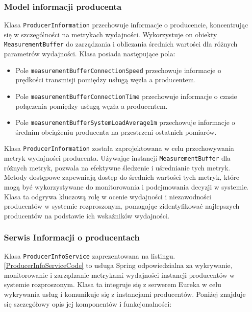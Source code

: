 \subsubsection{Model informacji producenta}

Klasa \verb|ProducerInformation| przechowuje informacje o producencie, koncentrując się w szczególności na metrykach wydajności. Wykorzystuje on obiekty \verb|MeasurementBuffer| do zarządzania i obliczania średnich wartości dla różnych parametrów wydajności. Klasa posiada następujące pola:

\begin{itemize}
    \item Pole \verb|measurementBufferConnectionSpeed| przechowuje informacje o prędkości transmisji pomiędzy usługą węzła a producentem.
    \item Pole \verb|measurementBufferConnectionTime| przechowuje informacje o czasie połączenia pomiędzy usługą węzła a producentem.
    \item Pole \verb|measurementBufferSystemLoadAverage1m| przechowuje informacje o średnim obciążeniu producenta na przestrzeni ostatnich pomiarów.
\end{itemize}

Klasa \verb|ProducerInformation| została zaprojektowana w celu przechowywania metryk wydajności producenta. Używając instancji \verb|MeasurementBuffer| dla różnych metryk, pozwala na efektywne śledzenie i uśrednianie tych metryk. Metody dostępowe zapewniają dostęp do średnich wartości tych metryk, które mogą być wykorzystywane do monitorowania i podejmowania decyzji w systemie. Klasa ta odgrywa kluczową rolę w ocenie wydajności i niezawodności producentów w systemie rozproszonym, pomagając zidentyfikować najlepszych producentów na podstawie ich wskaźników wydajności.

\subsubsection{Serwis Informacji o producentach}

Klasa \verb|ProducerInfoService| zaprezentowana na listingu.\ref{ProducerInfoServiceCode} to usługa Spring odpowiedzialna za wykrywanie, monitorowanie i zarządzanie metrykami wydajności instancji producentów w systemie rozproszonym. Klasa ta integruje się z serwerem Eureka w celu wykrywania usług i komunikuje się z instancjami producentów. Poniżej znajduje się szczegółowy opis jej komponentów i funkcjonalności:

